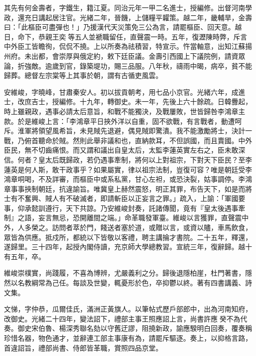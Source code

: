 \begin{pinyinscope}
其先有何金壽者，字鐵生，籍江夏。同治元年一甲二名進士，授編修。出督河南學政，還充日講起居注官。光緒二年，晉饑，上儲糧平糶策。越二年，畿輔旱，金壽曰：「此樞臣可盡彈也！」乃援漢代天災策免三公為言，請罷樞臣、回天意。越日，命下，恭親王奕等五人並褫職留任，直聲震一時。五年，復瀝陳時弊，斥言中外臣工皆瞻徇，侃侃不撓。上以所奏為祛積習，特宣示。忤當軸意，出知江蘇揚州府。未出都，會崇厚與俄定約，敕下廷臣議。金壽引西國上下議院例，請資眾論，折強敵。逾歲到官，錄築堤功，賜三品服。八年秋，禱雨中暍，病卒，貧不能歸葬。總督左宗棠等上其事於朝，謂有古循吏風雲。

安維峻，字曉峰，甘肅秦安人。初以拔貢朝考，用七品小京官。光緒六年，成進士，改庶吉士，授編修。十九年，轉御史。未一年，先後上六十餘疏。日韓釁起，時上雖親政，遇事必請太后意旨，和戰不能獨決，及戰屢敗，世皆歸咎李鴻章主款。於是維峻上言：「李鴻章平日挾外洋以自重，固不欲戰，有言戰者，動遭呵斥。淮軍將領望風希旨，未見賊先退避，偶見賊即驚潰。我不能激勵將士，決計一戰，乃俯首聽命於賊。然則此舉非議和也，直納款耳，不但誤國，而且賣國。中外臣民，無不切齒痛恨。而又謂和議出自皇太后，太監李蓮英實左右之，臣未敢深信。何者？皇太后既歸政，若仍遇事牽制，將何以上對祖宗，下對天下臣民？至李蓮英是何人斯，敢干政事乎？如果屬實，律以祖宗法制，豈復可容？唯是朝廷受李鴻章哃喝，不及詳審，而樞臣中或系私黨，甘心左袒，或恐決裂，姑事調停。李鴻章事事挾制朝廷，抗違諭旨。唯冀皇上赫然震怒，明正其罪，布告天下，如是而將士有不奮興、賊人有不破滅者，即請斬臣以正妄言之罪。」疏入，上諭：「軍國要事，仰承懿訓遵行，天下共諒。乃安維峻封奏，託諸傳聞，竟有『皇太後遇事牽制』之語，妄言無忌，恐開離間之端。」命革職發軍臺。維峻以言獲罪，直聲震中外，人多榮之。訪問者萃於門，餞送者塞於道，或贈以言，或資以贐，車馬飲食，眾皆為供應。抵戍所，都統以下皆敬以客禮，聘主講掄才書院。二十五年，釋還，遂歸里。三十四年，起授內閣侍讀，充京師大學總教習。宣統三年，復辭歸。越十有五年，卒。

維峻崇樸實，尚踐履，不喜為博辨，尤嚴義利之分。歸後退隱柏崖，杜門著書，隱然以名教綱常為己任。每談及世變，輒憂形於色，卒抑鬱以終。著有四書講義、詩文集。

文悌，字仲恭，瓜爾佳氏，滿洲正黃旗人。以筆帖式歷戶部郎中，出為河南知府，改御史。光緒二十四年，變法詔下，禮部主事王照應詔上言，尚書許應癸不為代奏。御史宋伯魯、楊深秀聯名劾以守舊迂謬，阻撓新政，諭應騤明白回奏，覆奏稱珍惜名器，物色通才，並辭連工部主事康有為，請罷斥驅逐。奏上，以抑格言路，首違詔旨，禮部尚書、侍郎皆革職，賞照四品京堂。


\end{pinyinscope}
